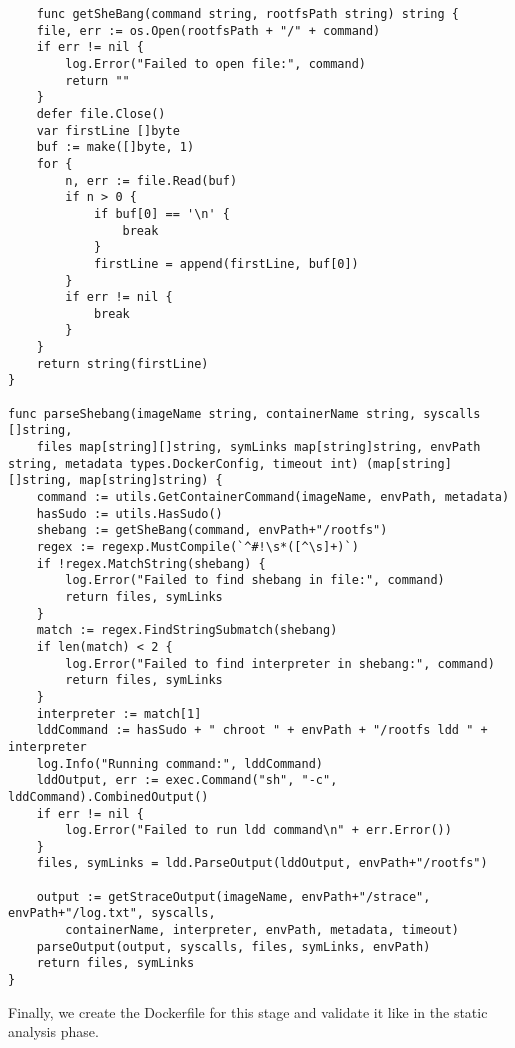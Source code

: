 \lstset{language=Go,caption=File util functions,label=lst:file-functions}
\begin{lstlisting}
    func getSheBang(command string, rootfsPath string) string {
	file, err := os.Open(rootfsPath + "/" + command)
	if err != nil {
		log.Error("Failed to open file:", command)
		return ""
	}
	defer file.Close()
	var firstLine []byte
	buf := make([]byte, 1)
	for {
		n, err := file.Read(buf)
		if n > 0 {
			if buf[0] == '\n' {
				break
			}
			firstLine = append(firstLine, buf[0])
		}
		if err != nil {
			break
		}
	}
	return string(firstLine)
}

func parseShebang(imageName string, containerName string, syscalls []string,
	files map[string][]string, symLinks map[string]string, envPath string, metadata types.DockerConfig, timeout int) (map[string][]string, map[string]string) {
	command := utils.GetContainerCommand(imageName, envPath, metadata)
	hasSudo := utils.HasSudo()
	shebang := getSheBang(command, envPath+"/rootfs")
	regex := regexp.MustCompile(`^#!\s*([^\s]+)`)
	if !regex.MatchString(shebang) {
		log.Error("Failed to find shebang in file:", command)
		return files, symLinks
	}
	match := regex.FindStringSubmatch(shebang)
	if len(match) < 2 {
		log.Error("Failed to find interpreter in shebang:", command)
		return files, symLinks
	}
	interpreter := match[1]
	lddCommand := hasSudo + " chroot " + envPath + "/rootfs ldd " + interpreter
	log.Info("Running command:", lddCommand)
	lddOutput, err := exec.Command("sh", "-c", lddCommand).CombinedOutput()
	if err != nil {
		log.Error("Failed to run ldd command\n" + err.Error())
	}
	files, symLinks = ldd.ParseOutput(lddOutput, envPath+"/rootfs")

	output := getStraceOutput(imageName, envPath+"/strace", envPath+"/log.txt", syscalls,
		containerName, interpreter, envPath, metadata, timeout)
	parseOutput(output, syscalls, files, symLinks, envPath)
	return files, symLinks
}
\end{lstlisting}

Finally, we create the Dockerfile for this stage and validate it like in the static analysis phase.

